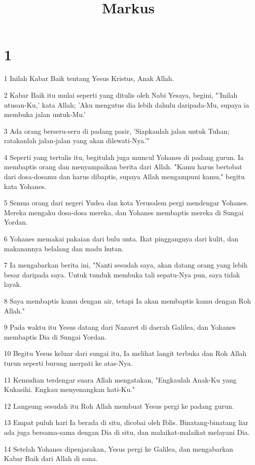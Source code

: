 

\title{Markus}


\chapter{1}

\par 1 Inilah Kabar Baik tentang Yesus Kristus, Anak Allah.
\par 2 Kabar Baik itu mulai seperti yang ditulis oleh Nabi Yesaya, begini, "'Inilah utusan-Ku,' kata Allah; 'Aku mengutus dia lebih dahulu daripada-Mu, supaya ia membuka jalan untuk-Mu.'
\par 3 Ada orang berseru-seru di padang pasir, 'Siapkanlah jalan untuk Tuhan; ratakanlah jalan-jalan yang akan dilewati-Nya.'"
\par 4 Seperti yang tertulis itu, begitulah juga muncul Yohanes di padang gurun. Ia membaptis orang dan menyampaikan berita dari Allah. "Kamu harus bertobat dari dosa-dosamu dan harus dibaptis, supaya Allah mengampuni kamu," begitu kata Yohanes.
\par 5 Semua orang dari negeri Yudea dan kota Yerusalem pergi mendengar Yohanes. Mereka mengaku dosa-dosa mereka, dan Yohanes membaptis mereka di Sungai Yordan.
\par 6 Yohanes memakai pakaian dari bulu unta. Ikat pinggangnya dari kulit, dan makanannya belalang dan madu hutan.
\par 7 Ia mengabarkan berita ini, "Nanti sesudah saya, akan datang orang yang lebih besar daripada saya. Untuk tunduk membuka tali sepatu-Nya pun, saya tidak layak.
\par 8 Saya membaptis kamu dengan air, tetapi Ia akan membaptis kamu dengan Roh Allah."
\par 9 Pada waktu itu Yesus datang dari Nazaret di daerah Galilea, dan Yohanes membaptis Dia di Sungai Yordan.
\par 10 Begitu Yesus keluar dari sungai itu, Ia melihat langit terbuka dan Roh Allah turun seperti burung merpati ke atas-Nya.
\par 11 Kemudian terdengar suara Allah mengatakan, "Engkaulah Anak-Ku yang Kukasihi. Engkau menyenangkan hati-Ku."
\par 12 Langsung sesudah itu Roh Allah membuat Yesus pergi ke padang gurun.
\par 13 Empat puluh hari Ia berada di situ, dicobai oleh Iblis. Binatang-binatang liar ada juga bersama-sama dengan Dia di situ, dan malaikat-malaikat melayani Dia.
\par 14 Setelah Yohanes dipenjarakan, Yesus pergi ke Galilea, dan mengabarkan Kabar Baik dari Allah di sana.

